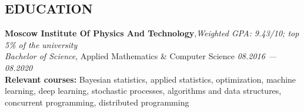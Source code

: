 \documentclass[11pt]{res}
\newcommand{\vmarginsmall}{\vspace{0.1cm}}
\begin{document}
\begin{resume}
\section{EDUCATION}
\vmarginsmall
\textbf{Moscow Institute Of Physics And Technology},\hfill \textit{Weighted GPA: 9.43/10; top 5\% of the university}\\
{\sl Bachelor of Science}, Applied Mathematics \& Computer Science \hfill \textit{08.2016 — 08.2020} \\
\textbf{Relevant courses:} Bayesian statistics, applied statistics, optimization, machine learning, deep learning, stochastic processes, algorithms and data structures, concurrent programming, distributed programming

\end{resume}
\end{document}
